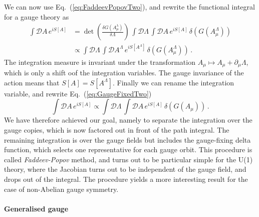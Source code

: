 We can now use Eq.~(\ref{eq:FaddeevPopovTwo}), and rewrite the
functional integral for a gauge theory as
\begin{align}
  \int \mathcal{D}A\, e^{i S[A]} 
  &= \det \left(
    \frac{\delta G\left(A^\lambda_\mu\right)}{\delta \Lambda}
    \right)\, \int \mathcal{D}\Lambda\, 
    \int \mathcal{D}A\,  e^{i S[A]} \, \delta\left(G\left(
      A^\Lambda_\mu\right)\right) \\
  \label{eq:GaugeFixedTwo}
  &\propto \int \mathcal{D}\Lambda\, 
    \int \mathcal{D}A^\Lambda\,  e^{i S[A^\Lambda]} \, \delta\left(G\left(
      A^\Lambda_\mu\right)\right) \, .
\end{align}
The integration measure is invariant under the transformation $A_\mu
\mapsto A_\mu + \partial_\mu \Lambda$, which is only a shift oof the
integration variables. The gauge invariance of the action means that
$S[A] = S[A^\Lambda]$. Finally we can rename the integration variable,
and rewrite Eq.~(\ref{eq:GaugeFixedTwo})
\begin{equation}
  \label{eq:GaugeFixedThree}
  \int \mathcal{D}A\, e^{i S[A]} 
  \propto \int \mathcal{D}\Lambda\, 
    \int \mathcal{D}A\,  e^{i S[A]} \, \delta\left(G\left(
      A_\mu\right)\right) \, .
\end{equation}
We have therefore achieved our goal, namely to separate the
integration over the gauge copies, which is now factored out in front
of the path integral. The remaining integration is over the gauge
fields but includes the gauge-fixing delta function, which selects one
representative for each gauge orbit. This procedure is called {\em
  Faddeev-Popov} method, and turns out to be particular simple for the
U(1) theory, where the Jacobian turns out to be independent of the
gauge field, and drops out of the integral. The procedure yields a
more interesting result for the case of non-Abelian gauge symmetry.  

\paragraph{Generalised gauge }

